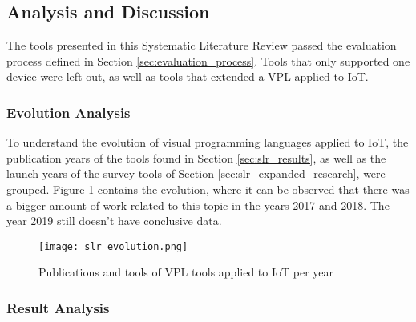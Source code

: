 \subsection{Analysis and Discussion}\label{sec:slr_discussion}

The tools presented in this Systematic Literature Review passed the evaluation process defined in Section \ref{sec:evaluation_process}. Tools that only supported one device were left out, as well as tools that extended a VPL applied to IoT. 

\subsubsection{Evolution Analysis}\label{sec:articles_nr_analysis}

To understand the evolution of visual programming languages applied to IoT, the publication years of the tools found in Section \ref{sec:slr_results}, as well as the launch years of the survey tools of Section \ref{sec:slr_expanded_research}, were grouped. Figure \ref{fig:slr_evolution} contains the evolution, where it can be observed that there was a bigger amount of work related to this topic in the years 2017 and 2018. The year 2019 still doesn't have conclusive data.

\begin{figure}[h]
\centering
\texttt{[image: slr\_evolution.png]}
\caption{Publications and tools of VPL tools applied to IoT per year}\label{fig:slr_evolution}
\end{figure}

\subsubsection{Result Analysis}\label{sec:result_analysis}

